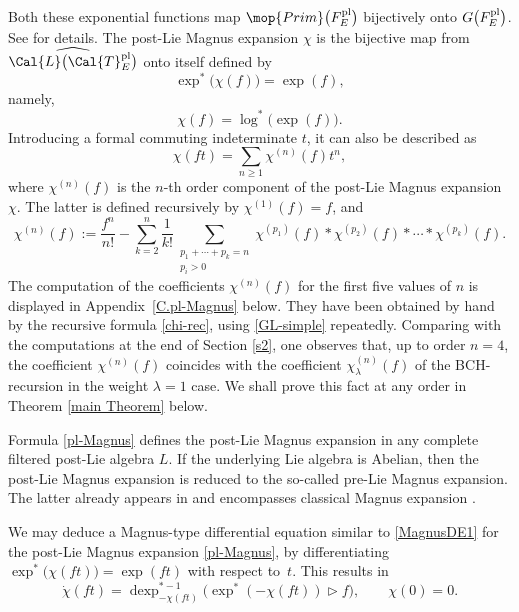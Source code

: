 \documentclass[10pt,a4paper]{amsart}
\numberwithin{equation}{section}
\begin{document}
Both these exponential functions map $\mop{Prim}\big(F^{\rm pl}_E\big)$ bijectively onto $G\big(F^{\rm pl}_E\big)$. See \cite{ELM2015} for details. The post-Lie Magnus expansion $\chi$ is the bijective map from $\widehat{\Cal{L}\big(\Cal{T}^{\rm pl}_E\big)}$ onto itself defined by
\begin{displaymath}
\exp^{*}\big(\chi(f)\big) = \exp(f),
\end{displaymath}
namely,
\begin{equation}
\label{pl-Magnus}
\chi(f) = \log^{\ast}\big(\exp(f)\big).
\end{equation}
Introducing a formal commuting indeterminate $t$, it can also be described as
\[
\chi(ft) = \sum_{n\geq 1}{\chi^{(n)}(f)}t^n,
\]
where $\chi^{(n)}(f)$ is the $n$-th order component of the post-Lie Magnus expansion $\chi$. The latter is defined recursively by $\chi^{(1)}(f) = f$, and \cite{ELM2015, EI2018, EIM2017}
\begin{equation}\label{chi-rec}
\chi^{(n)}(f)
:= \frac{f^{n}}{n!} - \sum_{k=2}^{n}{\frac{1}{k!}\sum_{\substack{p_{1} + \cdots + p_{k}
= n \\ p_{i}>0}}{\chi^{(p_{1})}(f)\ast \chi^{(p_{2})}(f) \ast \cdots \ast \chi^{(p_{k})}(f)}}.
\end{equation}
The computation of the coefficients $\chi^{(n)}(f)$ for the first five values of $n$ is displayed in Appendix~\ref{C.pl-Magnus} below. They have been obtained by hand by the recursive formula \eqref{chi-rec}, using \eqref{GL-simple} repeatedly. Comparing with the computations at the end of Section \ref{s2}, one observes that, up to order $n=4$, the coefficient $\chi^{(n)}(f)$ coincides with the coefficient $\chi_\lambda^{(n)}(f)$ of the BCH-recursion in the weight $\lambda = 1$ case. We shall prove this fact at any order in Theorem \ref{main Theorem} below.

\begin{Remark}\label{rem1}
Formula \eqref{pl-Magnus} defines the post-Lie Magnus expansion in any complete filtered post-Lie algebra $L$. If the underlying Lie algebra is Abelian, then the post-Lie Magnus expansion is reduced to the so-called pre-Lie Magnus expansion. The latter already appears in \cite{AG81} and encompasses classical Magnus expansion \cite{WM54}.
\end{Remark}

\begin{Remark}\label{remMagnus1}
 We may deduce a Magnus-type differential equation similar to \eqref{MagnusDE1} for the post-Lie Magnus expansion \eqref{pl-Magnus}, by differentiating $\exp^{*}\big(\chi(ft)\big) = \exp(ft)$ with respect to~$t$. This results in
\begin{displaymath}
\dot{\chi}(ft) = \operatorname{dexp}^{\ast -1}_{- \chi(ft)}\big( \exp^*(- \chi(ft)) \rhd f \big), \qquad \chi(0)=0.
\end{displaymath}
\end{Remark}
\end{document}
